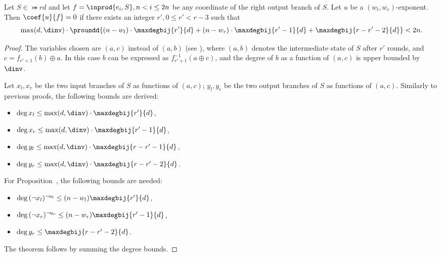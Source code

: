 \begin{theorem}
Let $S \in \bij{r}{d}$ and let $f = \inprod{e_i, S}, n < i \le 2n$ be any coordinate of the right output branch of $S$.
Let $u$ be a $(w_l,w_r)$-exponent. Then $\coef{u}{f} = 0$ if there exists an integer $r', 0 \le r' < r - 3$ such that
$$
\max(d,\dinv) \cdot \proundd{
    (n - w_l)\cdot\maxdegbij{r'}{d} +
    (n - w_r)\cdot\maxdegbij{r'-1}{d} +
    \maxdegbij{r-r'-2}{d}
} < 2n.
$$
\end{theorem}
\begin{proof}
The variables chosen are $(a,c)$ instead of $(a,b)$ (see ), where $(a,b)$ denotes the intermediate state of $S$ after $r'$ rounds, and $c = f_{r'+1}(b) \oplus a$. In this case $b$ can be expressed as $f_{r'+1}^{-1}(a \oplus c)$, and the degree of $b$ as a function of $(a,c)$ is upper bounded by $\dinv$.

Let $x_l,x_r$ be the two input branches of $S$ as functions of $(a,c)$; $y_l,y_r$ be the two output branches of $S$ as functions of $(a,c)$.
Similarly to previous proofs, the following bounds are derived:
\begin{itemize}
    \item $\deg{x_l} \le \max(d,\dinv)\cdot \maxdegbij{r'}{d}$,
    \item $\deg{x_r} \le \max(d,\dinv)\cdot \maxdegbij{r'-1}{d}$,
    \item $\deg{y_l} \le \max(d,\dinv)\cdot \maxdegbij{r-r'-1}{d}$, 
    \item $\deg{y_r} \le \max(d,\dinv)\cdot \maxdegbij{r-r'-2}{d}$.
\end{itemize}
For Proposition~, the following bounds are needed:
\begin{itemize}
    \item $\deg{(\lnot x_l)^{\lnot u_l} } \le (n - w_l)\maxdegbij{r'}{d}$,
    \item $\deg{(\lnot x_r)^{\lnot u_r} } \le (n - w_r)\maxdegbij{r'-1}{d}$,
    \item $\deg{y_r} \le \maxdegbij{r - r' - 2}{d}$.
\end{itemize}
The theorem follows by summing the degree bounds.
\end{proof}

